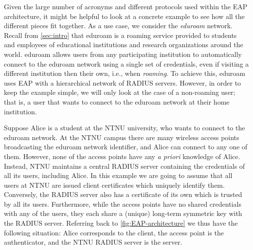 \begin{example}\label{example:eduroam}
Given the large number of acronyms and different protocols used within the EAP architecture,
it might be helpful to look at a concrete example to see how all the different pieces fit together.
As a use case, we consider the \emph{eduroam} network.
Recall from \cref{sec:intro} that eduroam is a roaming service provided to students and employees of educational institutions and research organizations around the world. 
eduroam allows users from any participating institution to automatically connect to the eduroam network using a single set of credentials,
even if visiting a different institution then their own,
i.e., when \emph{roaming}.
To achieve this,
eduroam uses EAP with a hierarchical network of RADIUS servers.
However,
in order to keep the example simple, we will only look at the case of a non-roaming user;
that is, a user that wants to connect to the eduroam network at their home institution.

Suppose Alice is a student at the NTNU university,
who wants to connect to the eduroam network. 
At the NTNU campus there are many wireless access points broadcasting the eduroam network identifier,
and Alice can connect to any one of them.
However,
none of the access points have any \emph{a priori} knowledge of Alice.
Instead, 
NTNU maintains a central RADIUS server containing the credentials of all its users, including Alice. 
In this example we are going to assume that all users at NTNU are issued client certificates which uniquely identify them.
Conversely,
the RADIUS server also has a certificate of its own which is trusted by all its users.
Furthermore,
while the access points have no shared credentials with any of the users,
they each share a (unique) long-term symmetric key with the RADIUS server.
Referring back to \cref{fig:EAP-architecture} we thus have the following situation:
Alice corresponds to the client,
the access point is the authenticator,
and the NTNU RADIUS server is the server.


\end{example}
